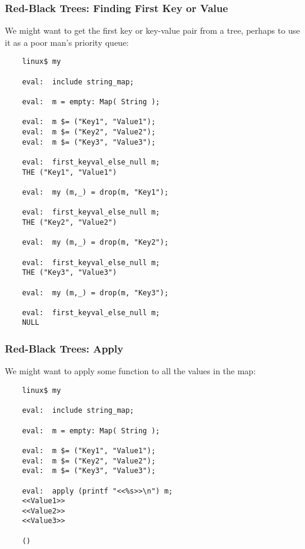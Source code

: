 \cutend*

\subsubsection{Red-Black Trees:  Finding First Key or Value}

We might want to get the first key or key-value pair from a tree, 
perhaps to use it as a poor man's priority queue:

\begin{verbatim}
    linux$ my

    eval:  include string_map;

    eval:  m = empty: Map( String );

    eval:  m $= ("Key1", "Value1");
    eval:  m $= ("Key2", "Value2");
    eval:  m $= ("Key3", "Value3");

    eval:  first_keyval_else_null m;
    THE ("Key1", "Value1")

    eval:  my (m,_) = drop(m, "Key1");

    eval:  first_keyval_else_null m;
    THE ("Key2", "Value2")

    eval:  my (m,_) = drop(m, "Key2");

    eval:  first_keyval_else_null m;
    THE ("Key3", "Value3")

    eval:  my (m,_) = drop(m, "Key3");

    eval:  first_keyval_else_null m;
    NULL
\end{verbatim}


\cutend*

\subsubsection{Red-Black Trees:  Apply}

We might want to apply some function to all the values in the map:

\begin{verbatim}
    linux$ my

    eval:  include string_map;

    eval:  m = empty: Map( String );

    eval:  m $= ("Key1", "Value1");
    eval:  m $= ("Key2", "Value2");
    eval:  m $= ("Key3", "Value3");

    eval:  apply (printf "<<%s>>\n") m;
    <<Value1>>
    <<Value2>>
    <<Value3>>

    ()
\end{verbatim}

